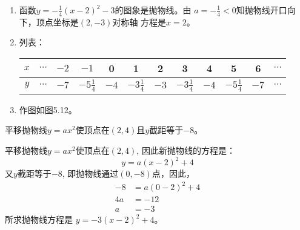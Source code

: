 \begin{solution}
\begin{enumerate}
    \item 函数$y=-\frac{1}{4}(x-2)^2-3$的图象是抛物线。由
    $a=-\frac{1}{4}<0$知抛物线开口向下，顶点坐标是$(2,-3)$对称轴
    方程是$x=2$。
  \item 列表：
\begin{center}
\begin{tabular}{c|ccccccccccc}
\hline
$x$&$\cdots$& $-2$ &  $-1$ & 0 &  1 & 2 &  3 &  4 &  5 &  6 &$\cdots$\\
\hline
$y$&$\cdots$ & $-7$& $-5\tfrac{1}{4}$ &  $-4$ &  $-3\tfrac{1}{4}$ &  $-3$ &  $-3\tfrac{1}{4}$ &  $-4$ &  $-5\tfrac{1}{4}$ &  $-7$ &  $\cdots$ \\
\hline
\end{tabular}
\end{center}  

\item 作图如图5.12。
\end{enumerate}

\begin{figure}[htp]
    \centering
{}
    \caption{}
\end{figure}
\end{solution}


\begin{example}
    平移抛物线$y=ax^2$使顶点在$(2,4)$且$y$截距等于$-8$。
\end{example}

\begin{solution}
    平移抛物线$y=ax^2$使顶点在$(2,4)$, 因此新抛物线的方程是：
   \[ y=a(x-2)^2+4\]
    又$y$截距等于$-8$, 即抛物线通过$(0,-8)$点，因此，
\[\begin{split}
    -8&=a(0-2)^2+4\\
4a&=-12\\
a&=-3
\end{split}\]
所求抛物线方程是 $y=-3(x-2)^2+4$。
\end{solution}

